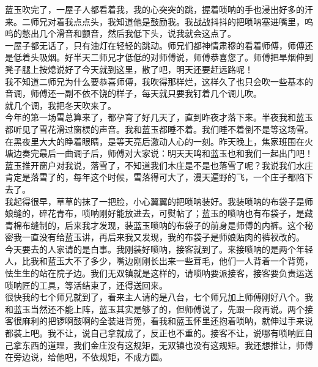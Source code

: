 蓝玉吹完了，一屋子人都看着我，我的心突突的跳，握着唢呐的手也浸出好多的汗来。二师兄对着我点点头，我知道他是鼓励我。我战战抖抖的把唢呐塞进嘴里，呜呜的憋出几个滑音和颤音，然后我低下头，说我就会这点了。
\\

一屋子都无话了，只有油灯在轻轻的跳动。师兄们都神情肃穆的看着师傅，师傅还是低着头吸烟。好半天二师兄才低低的对师傅说，师傅恭喜您了。师傅把旱烟伸到凳子腿上按熄说好了今天就到这里，散了吧，明天还要赶远路呢！\\

我不知道二师兄为什么要恭喜师傅，我吹得那样烂，这样久了也只会吹一些基本的音调，师傅还一副不依不饶的样子，每天就只要我钉着几个调儿吹。
\\

就几个调，我把冬天吹来了。
\\

今年的第一场雪总算来了，都孕育了好几天了，直到昨夜才落下来。半夜我和蓝玉都听见了雪花滑过窗棂的声音。我和蓝玉都睡不着。我们睡不着倒不是等这场雪。在黑夜里大大的睁着眼睛，是等天亮后激动人心的一刻。昨天晚上，焦家班围在火塘边奏完最后一曲调子后，师傅对大家说：明天天鸣和蓝玉也和我们一起出门吧！
\\

蓝玉推开窗户对我说，落雪了，不知道我们木庄是不是也落雪了呢？我说我们水庄肯定是落雪了的，每年这个时候，雪落得可大了，漫天遍野的飞，一个庄子都陷下去了。
\\

我起得很早，草草的抹了一把脸，小心翼翼的把唢呐装好。我装唢呐的布袋子是师娘缝的，碎花青布，唢呐刚好能放进去，可熨帖了；蓝玉的唢呐也有布袋子，是藏青棉布缝制的，后来我才发现，装蓝玉唢呐的布袋子的前身是师傅的内裤。这个秘密我一直没有给蓝玉讲，再后来我又发现，我的布袋子是师娘贴肉的裤衩改的。
\\

今天要去的人家请的是白事。我刚装好唢呐，接客就到了。来接唢呐的是两个年轻人，比我和蓝玉大不了多少，嘴边刚刚长出来一些茸毛，他们一人背着一个背篼，怯生生的站在院子边。我们无双镇就是这样的，请唢呐要派接客，接客要负责运送唢呐匠的工具，等活结束了，还得送回来。
\\

很快我的七个师兄就到了，看来主人请的是八台，七个师兄加上师傅刚好八个。我和蓝玉当然还不能上阵，蓝玉其实是够了的，但师傅说了，先跟一段再说。两个接客很麻利的把锣啊鼓啊的全装进背篼，看我和蓝玉怀里还抱着唢呐，就伸过手来说都装上吧。我不让，说自己拿就成了，反正也不重的。接客不让，说哪有唢呐匠自己拿东西的道理，我们金庄没有这规矩，无双镇也没有这规矩。我还想推让，师傅在旁边说，给他吧，不依规矩，不成方圆。
\\

